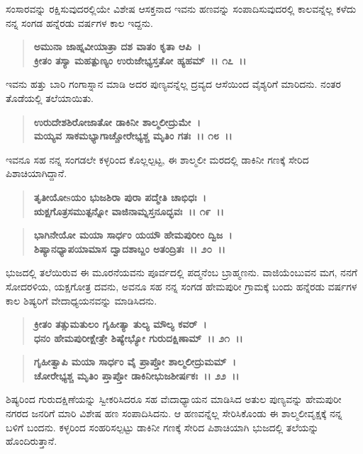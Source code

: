 ಸಂಸಾರವನ್ನು ರಕ್ಷಿಸುವುದರಲ್ಲಿಯೇ ವಿಶೇಷ ಆಸಕ್ತನಾದ ಇವನು ಹಣವನ್ನು ಸಂಪಾದಿಸುವುದರಲ್ಲಿ ಕಾಲವನ್ನೆಲ್ಲ ಕಳೆದು ನನ್ನ ಸಂಗಡ ಹನ್ನೆರಡು ವರ್ಷಗಳ ಕಾಲ ಇದ್ದನು.

\begin{verse}
\textbf{ಅಮುನಾ ಜಾಹ್ನವೀಯಾತ್ರಾ ದಶ ವಾತಂ ಕೃತಾ ಆಪಿ~।}\\\textbf{ಕ್ರೀತಂ ತಸ್ಯಾ ಮಹತ್ಪುಣ್ಯಂ ಉರುಜೇಭ್ಯಸ್ತತೋ ಹ್ಯಹಮ್~।। ೧೭~।।}
\end{verse}

ಇವನು ಹತ್ತು ಬಾರಿ ಗಂಗಾಸ್ನಾನ ಮಾಡಿ ಅದರ ಪುಣ್ಯವನ್ನೆಲ್ಲ ದ್ರವ್ಯದ ಆಸೆಯಿಂದ ವೈಶ್ಯರಿಗೆ ಮಾರಿದನು. ನಂತರ ತೊಡೆಯಲ್ಲಿ ತಲೆಯಾಯಿತು.

\begin{verse}
\textbf{ಉರುದೇಶಶಿರೋಜಾತೋ ಡಾಕಿನೀ ಶಾಲ್ಮಲೀದ್ರುಮೇ~।}\\\textbf{ಮಯ್ಯವ ಸಾಕಮಭ್ಯಾಗಾಚ್ಚೋರೇಭ್ಯಶ್ಚ ಮೃತಿಂ ಗತಃ~।। ೧೮~।।}
\end{verse}

ಇವನೂ ಸಹ ನನ್ನ ಸಂಗಡಲೇ ಕಳ್ಳರಿಂದ ಕೊಲ್ಲಲ್ಪಟ್ಟ, ಈ ಶಾಲ್ಮಲೀ ಮರದಲ್ಲಿ ಡಾಕಿನೀ ಗಣಕ್ಕೆ ಸೇರಿದ ಪಿಶಾಚಿಯಾಗಿದ್ದಾನೆ.

\begin{verse}
\textbf{ತೃತೀಯೋsಯಂ ಭುಜಶಿರಾ ಪುರಾ ಪದ್ಮೇತಿ ಚಾಭಿಧಃ~।}\\\textbf{ಋಕ್ಷಗೊತ್ರಸಮುತ್ಪನ್ನೋ ವಾಜಿನಾಮ್ನಸ್ತನೂದ್ಭವಃ~।। ೧೯~।।}
\end{verse}

\begin{verse}
\textbf{ಭಾಗಿನೇಯೋ ಮಯಾ ಸಾರ್ಧಂ ಯಯೌ ಹೇಮಪುರೀಂ ದ್ವಿಜ~।}\\\textbf{ಶಿಷ್ಯಾನಧ್ಯಾಪಯಾಮಾಸ ದ್ವಾದಶಾಬ್ದಂ ಅತಂದ್ರಿತಃ~।। ೨೦~।।}
\end{verse}

ಭುಜದಲ್ಲಿ ತಲೆಯಿರುವ ಈ ಮೂರನೆಯವನು ಪೂರ್ವದಲ್ಲಿ ಪದ್ಮನೆಂಬ ಬ್ರಾಹ್ಮಣನು. ವಾಜಿಯೆಂಬುವನ ಮಗ, ನನಗೆ ಸೋದರಳಿಯ, ಯಕ್ಷಗೋತ್ರ ದವನು, ಅವನೂ ಸಹ ನನ್ನ ಸಂಗಡ ಹೇಮಪುರೀ ಗ್ರಾಮಕ್ಕೆ ಬಂದು ಹನ್ನೆರಡು ವರ್ಷಗಳ ಕಾಲ ಶಿಷ್ಯರಿಗೆ ವೇದಾಧ್ಯಯನವನ್ನು ಮಾಡಿಸಿದನು.

\begin{verse}
\textbf{ಕ್ರೀತಂ ತತ್ಸುಮತುಲಂ ಗೃಹೀತ್ಯಾ ತುಲ್ಯ ಮೌಲ್ಯ ಕವರ್~।}\\\textbf{ಧನಂ ಹೇಮಪುರೀಕ್ಷೇತ್ರೇ ಶಿಷ್ಯೇಭ್ಯೋ ಗುರುದಕ್ಷಿಣಾಮ್~।। ೨೧~।।} 
\end{verse}

\begin{verse}
\textbf{ಗೃಹೀತ್ವಾಪಿ ಮಯಾ ಸಾರ್ಧಂ ವೈ ಪ್ರಾಪ್ತೋ ಶಾಲ್ಮಲೀದ್ರುಮಮ್~।}\\\textbf{ಚೋರೇಭ್ಯಶ್ಚ ಮೃತಿಂ ಪ್ತಾಪ್ತೋ ಡಾಕಿನೀಭುಜಶೀರ್ಷಕಃ~।। ೨೨~।।}
\end{verse}

ಶಿಷ್ಯರಿಂದ ಗುರುದಕ್ಷಿಣೆಯನ್ನು ಸ್ವೀಕರಿಸಿದರೂ ಸಹ ವೆಃದಾಧ್ಯಾಯನ ಮಾಡಿಸಿದ ಅತುಲ ಪುಣ್ಯವನ್ನು ಹೇಮಪುರೀ ನಗರದ ಜನರಿಗೆ ಮಾರಿ ವಿಶೇಷ ಹಣ ಸಂಪಾದಿಸಿದನು. ಆ ಹಣವನ್ನೆಲ್ಲ ಸೇರಿಸಿಕೊಂಡು ಈ ಶಾಲ್ಮಲೀವೃಕ್ಷಕ್ಕೆ ನನ್ನ ಬಳಿಗೆ ಬಂದನು. ಕಳ್ಳರಿಂದ ಸಂಹರಿಸಲ್ಪಟ್ಟು ಡಾಕಿನೀ ಗಣಕ್ಕೆ ಸೇರಿದ ಪಿಶಾಚಿಯಾಗಿ ಭುಜದಲ್ಲಿ ತಲೆಯನ್ನು ಹೊಂದಿರುತ್ತಾನೆ.

